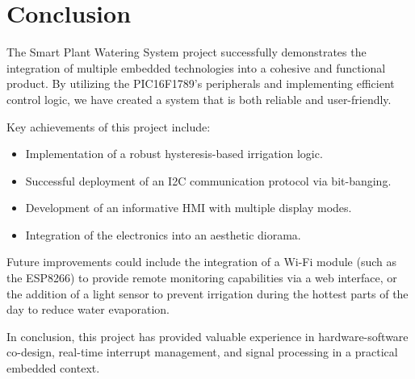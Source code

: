 \section{Conclusion}
The Smart Plant Watering System project successfully demonstrates the integration of multiple embedded technologies into a cohesive and functional product. By utilizing the PIC16F1789's peripherals and implementing efficient control logic, we have created a system that is both reliable and user-friendly.

Key achievements of this project include:
\begin{itemize}
    \item Implementation of a robust hysteresis-based irrigation logic.
    \item Successful deployment of an I2C communication protocol via bit-banging.
    \item Development of an informative HMI with multiple display modes.
    \item Integration of the electronics into an aesthetic diorama.
\end{itemize}

Future improvements could include the integration of a Wi-Fi module (such as the ESP8266) to provide remote monitoring capabilities via a web interface, or the addition of a light sensor to prevent irrigation during the hottest parts of the day to reduce water evaporation.

In conclusion, this project has provided valuable experience in hardware-software co-design, real-time interrupt management, and signal processing in a practical embedded context.
